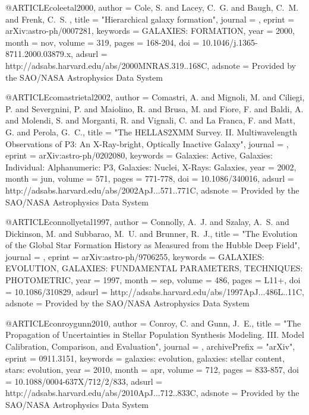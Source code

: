{{{{{{{{{{{{{{@ARTICLE{coleetal2000,
   author = {{Cole}, S. and {Lacey}, C.~G. and {Baugh}, C.~M. and {Frenk}, C.~S.
	},
    title = "{Hierarchical galaxy formation}",
  journal = {\mnras},
   eprint = {arXiv:astro-ph/0007281},
 keywords = {GALAXIES: FORMATION},
     year = 2000,
    month = nov,
   volume = 319,
    pages = {168-204},
      doi = {10.1046/j.1365-8711.2000.03879.x},
   adsurl = {http://adsabs.harvard.edu/abs/2000MNRAS.319..168C},
  adsnote = {Provided by the SAO/NASA Astrophysics Data System}
}

@ARTICLE{comastrietal2002,
   author = {{Comastri}, A. and {Mignoli}, M. and {Ciliegi}, P. and {Severgnini}, P. and 
	{Maiolino}, R. and {Brusa}, M. and {Fiore}, F. and {Baldi}, A. and 
	{Molendi}, S. and {Morganti}, R. and {Vignali}, C. and {La Franca}, F. and 
	{Matt}, G. and {Perola}, G.~C.},
    title = "{The HELLAS2XMM Survey. II. Multiwavelength Observations of P3: An X-Ray-bright, Optically Inactive Galaxy}",
  journal = {\apj},
   eprint = {arXiv:astro-ph/0202080},
 keywords = {Galaxies: Active, Galaxies: Individual: Alphanumeric: P3, Galaxies: Nuclei, X-Rays: Galaxies},
     year = 2002,
    month = jun,
   volume = 571,
    pages = {771-778},
      doi = {10.1086/340016},
   adsurl = {http://adsabs.harvard.edu/abs/2002ApJ...571..771C},
  adsnote = {Provided by the SAO/NASA Astrophysics Data System}
}


@ARTICLE{connollyetal1997,
   author = {{Connolly}, A.~J. and {Szalay}, A.~S. and {Dickinson}, M. and 
	{Subbarao}, M.~U. and {Brunner}, R.~J.},
    title = "{The Evolution of the Global Star Formation History as Measured from the Hubble Deep Field}",
  journal = {\apjl},
   eprint = {arXiv:astro-ph/9706255},
 keywords = {GALAXIES: EVOLUTION, GALAXIES: FUNDAMENTAL PARAMETERS, TECHNIQUES: PHOTOMETRIC},
     year = 1997,
    month = sep,
   volume = 486,
    pages = {L11+},
      doi = {10.1086/310829},
   adsurl = {http://adsabs.harvard.edu/abs/1997ApJ...486L..11C},
  adsnote = {Provided by the SAO/NASA Astrophysics Data System}
}

@ARTICLE{conroygunn2010,
   author = {{Conroy}, C. and {Gunn}, J.~E.},
    title = "{The Propagation of Uncertainties in Stellar Population Synthesis Modeling. III. Model Calibration, Comparison, and Evaluation}",
  journal = {\apj},
archivePrefix = "arXiv",
   eprint = {0911.3151},
 keywords = {galaxies: evolution, galaxies: stellar content, stars: evolution},
     year = 2010,
    month = apr,
   volume = 712,
    pages = {833-857},
      doi = {10.1088/0004-637X/712/2/833},
   adsurl = {http://adsabs.harvard.edu/abs/2010ApJ...712..833C},
  adsnote = {Provided by the SAO/NASA Astrophysics Data System}
}




}}}}}}}}}}}}}}
